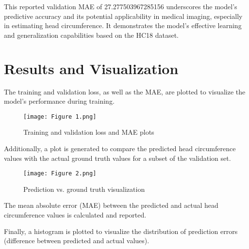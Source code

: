 \documentclass[twocolumn]{article}
\begin{document}
This reported validation MAE of 27.277503967285156 underscores the model's predictive accuracy and its potential applicability in medical imaging, especially in estimating head circumference. It demonstrates the model's effective learning and generalization capabilities based on the HC18 dataset.


\section{Results and Visualization}
The training and validation loss, as well as the MAE, are plotted to visualize the model's performance during training.

\begin{figure}[htbp]
    \centering
    \texttt{[image: Figure 1.png]}
    \caption{Training and validation loss and MAE plots}
    \label{fig:training_loss_mae}
\end{figure}

Additionally, a plot is generated to compare the predicted head circumference values with the actual ground truth values for a subset of the validation set.

\begin{figure}[htbp]
    \centering
    \texttt{[image: Figure 2.png]}
    \caption{Prediction vs. ground truth visualization}
    \label{fig:prediction_vs_ground_truth}
\end{figure}

The mean absolute error (MAE) between the predicted and actual head circumference values is calculated and reported.

Finally, a histogram is plotted to visualize the distribution of prediction errors (difference between predicted and actual values).
\end{document}
